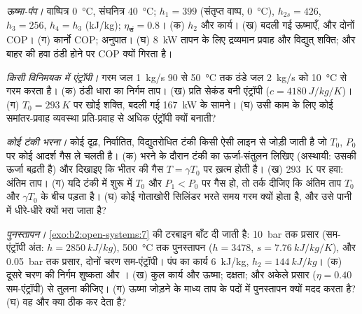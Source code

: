 \begin{exercise}[$\star\star$]\label{exo:b2:open-systems:8}
\emph{ऊष्मा-पंप।} वाष्पित्र \qty{0}{\celsius}, संघनित्र \qty{40}{\celsius};
$h_1 = 399$ (संतृप्त वाष्प, \qty{0}{\celsius}), $h_{2s} = 426$, $h_3 = 256$,
$h_4 = h_3$ (\unit{kJ/kg}); $\eta_{\text{सं}} = 0.8$। (क) $h_2$ और कार्य।
(ख) बदली गई ऊष्माएँ, और दोनों COP। (ग) कार्नो COP; अनुपात। (घ) \qty{8}{kW}
तापन के लिए द्रव्यमान प्रवाह और विद्युत् शक्ति; और बाहर की हवा ठंडी होने पर
COP क्यों गिरता है।
\end{exercise}

\begin{exercise}[$\star\star$]\label{exo:b2:open-systems:9}
\emph{किसी विनिमयक में एंट्रॉपी।} गरम जल \qty{1}{kg/s} \qty{90}{} से
\qty{50}{\celsius} तक ठंडे जल \qty{2}{kg/s} को \qty{10}{\celsius} से गरम करता है।
(क) ठंडी धारा का निर्गम ताप। (ख) प्रति सेकंड बनी
एंट्रॉपी ($c = \qty{4180}{J/kg/K}$)। (ग) $T_0 = \qty{293}{K}$ पर खोई शक्ति,
बदली गई \qty{167}{kW} के सामने। (घ) उसी काम के लिए कोई समांतर-प्रवाह
व्यवस्था प्रति-प्रवाह से अधिक एंट्रॉपी क्यों बनाती?
\end{exercise}

\begin{exercise}[$\star\star\star$]\label{exo:b2:open-systems:10}
\emph{कोई टंकी भरना।} कोई दृढ़, निर्वातित, विद्युतरोधित टंकी किसी ऐसी लाइन से
जोड़ी जाती है जो $T_0$, $P_0$ पर कोई आदर्श गैस ले चलती है। (क) भरने के दौरान टंकी का
ऊर्जा-संतुलन लिखिए (अस्थायी: उसकी ऊर्जा बढ़ती है) और
दिखाइए कि भीतर की गैस $T = \gamma T_0$ पर ख़त्म होती है। (ख) \qty{293}{K} पर हवा:
अंतिम ताप। (ग) यदि टंकी में शुरू में $T_0$ और
$P_1 < P_0$ पर गैस हो, तो तर्क दीजिए कि अंतिम ताप $T_0$ और
$\gamma T_0$ के बीच पड़ता है। (घ) कोई गोताखोरी सिलिंडर भरते समय गरम क्यों होता है, और उसे
पानी में धीरे-धीरे क्यों भरा जाता है?
\end{exercise}

\begin{exercise}[$\star\star\star$]\label{exo:b2:open-systems:11}
\emph{पुनस्तापन।} \cref{exo:b2:open-systems:7} की टरबाइन बाँट दी जाती है:
\qty{10}{bar} तक प्रसार (सम-एंट्रॉपी अंत: $h = \qty{2850}{kJ/kg}$), \qty{500}{\celsius}
तक पुनस्तापन ($h = 3478$, $s = \qty{7.76}{kJ/kg/K}$), और
\qty{0.05}{bar} तक प्रसार, दोनों चरण सम-एंट्रॉपी। पंप का कार्य \qty{6}{kJ/kg}, $h_2 =
\qty{144}{kJ/kg}$। (क) दूसरे चरण की निर्गम शुष्कता और । (ख)
कुल कार्य और ऊष्मा; दक्षता; और अकेले प्रसार
($\eta = 0.40$ सम-एंट्रॉपी) से तुलना कीजिए। (ग) ऊष्मा जोड़ने के माध्य ताप के पदों में
पुनस्तापन क्यों मदद करता है? (घ) वह और क्या ठीक कर देता है?
\end{exercise}

